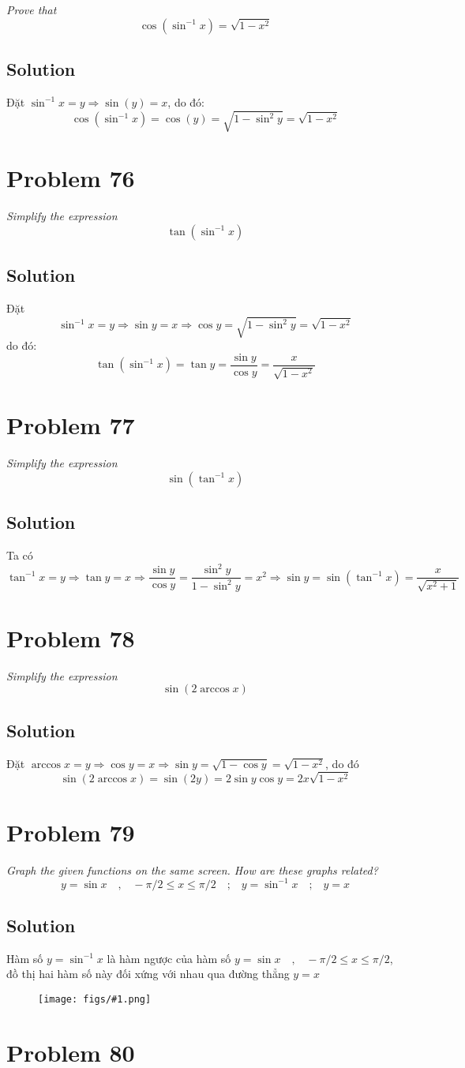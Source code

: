 \documentclass[11pt]{article}
\newcommand{\soln}{\subsection*}
\newcommand{\qn}{\textit}
\newcommand{\imgsoln}[1]{
	\begin{figure}[H]
		\centering
		\texttt{[image: figs/\#1.png]}
	\end{figure}
}
\newcommand{\eqtext}[1]{\quad\text{#1}\quad}
\begin{document}
\qn{Prove that $$\cos(\sin^{-1}x)=\sqrt{1-x^2}$$}

\soln{Solution}
Đặt $\sin^{-1}x=y \Rightarrow \sin(y)=x$, do đó: $$\cos(\sin^{-1}x)=\cos(y)=\sqrt{1-\sin^2y}=\sqrt{1-x^2}$$

\section*{Problem 76}

\qn{Simplify the expression $$\tan(\sin^{-1}x)$$}

\soln{Solution}
Đặt $$\sin^{-1}x=y \Rightarrow \sin{y}=x \Rightarrow \cos{y}=\sqrt{1-\sin^2{y}}=\sqrt{1-x^2}$$ do đó: $$\tan(\sin^{-1}x)=\tan{y}=\frac{\sin{y}}{\cos{y}}=\frac{x}{\sqrt{1-x^2}}$$

\section*{Problem 77}

\qn{Simplify the expression $$\sin(\tan^{-1}x)$$}

\soln{Solution}
Ta có $$\tan^{-1}x=y \Rightarrow \tan{y}=x \Rightarrow \frac{\sin{y}}{\cos{y}}=\frac{\sin^2{y}}{1-\sin^2{y}}=x^2 \Rightarrow \sin{y}=\sin(\tan^{-1}x)=\frac{x}{\sqrt{x^2+1}}$$

\section*{Problem 78}

\qn{Simplify the expression $$\sin(2\arccos{x})$$}

\soln{Solution}
Đặt $\arccos{x}=y \Rightarrow \cos{y}=x \Rightarrow \sin{y}=\sqrt{1-\cos{y}}=\sqrt{1-x^2}$, do đó $$\sin(2\arccos{x})=\sin(2y)=2\sin{y}\cos{y}=2x\sqrt{1-x^2}$$

\section*{Problem 79}

\qn{Graph the given functions on the same screen. How are these graphs related? $$y=\sin{x} \eqtext{,} -\pi/2 \le x \le \pi/2 \eqtext{;} y=\sin^{-1}x \eqtext{;} y=x$$}
\soln{Solution}
Hàm số $y=\sin^{-1}x$ là hàm ngược của hàm số $y=\sin{x} \eqtext{,} -\pi/2 \le x \le \pi/2$, đồ thị hai hàm số này đối xứng với nhau qua đường thẳng $y=x$
\imgsoln{1.5.79-ans}

\section*{Problem 80}
\end{document}

